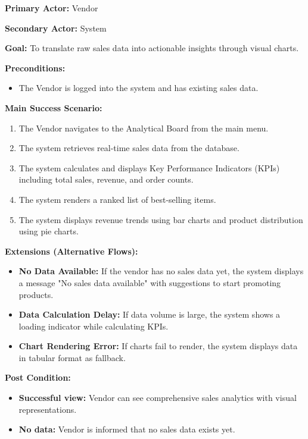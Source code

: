\textbf{Primary Actor:} Vendor

\textbf{Secondary Actor:} System

\textbf{Goal:} To translate raw sales data into actionable insights through visual charts.

\textbf{Preconditions:}
\begin{itemize}
    \item The Vendor is logged into the system and has existing sales data.
\end{itemize}

\textbf{Main Success Scenario:}
\begin{enumerate}
    \item The Vendor navigates to the Analytical Board from the main menu.
    \item The system retrieves real-time sales data from the database.
    \item The system calculates and displays Key Performance Indicators (KPIs) including total sales, revenue, and order counts.
    \item The system renders a ranked list of best-selling items.
    \item The system displays revenue trends using bar charts and product distribution using pie charts.
\end{enumerate}

\textbf{Extensions (Alternative Flows):}
\begin{itemize}
    \item[2a.] \textbf{No Data Available:} If the vendor has no sales data yet, the system displays a message "No sales data available" with suggestions to start promoting products.
    
    \item[3a.] \textbf{Data Calculation Delay:} If data volume is large, the system shows a loading indicator while calculating KPIs.
    
    \item[5a.] \textbf{Chart Rendering Error:} If charts fail to render, the system displays data in tabular format as fallback.
\end{itemize}

\textbf{Post Condition:}
\begin{itemize}
    \item \textbf{Successful view:} Vendor can see comprehensive sales analytics with visual representations.
    \item \textbf{No data:} Vendor is informed that no sales data exists yet.
\end{itemize}


